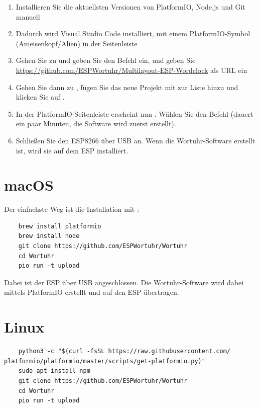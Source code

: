 \documentclass[12pt,a4paper, german,oneside, headinclude, headsepline,plainheadsepline,BCOR20mm, DIV18,parskip=half, openright, numbers=noenddot, captions=tableheading,version=first,listof=totoc,version=first]{scrbook}
\begin{document}
\begin{enumerate}
    \item Installieren Sie die aktuellsten Versionen von PlatformIO, Node.js und Git manuell
    \item Dadurch wird Visual Studio Code installiert, mit einem PlatformIO-Symbol (Ameisenkopf/Alien) in der Seitenleiste
    \item Gehen Sie zu  und geben Sie den Befehl  ein, und geben Sie \href{https://github.com/ESPWortuhr/Multilayout-ESP-Wordclock}{https://github.com/ESPWortuhr/Multilayout-ESP-Wordclock} als URL ein
    \item Gehen Sie dann zu , fügen Sie das neue Projekt mit  zur Liste hinzu und klicken Sie auf .
    \item In der PlatformIO-Seitenleiste erscheint nun . Wählen Sie den Befehl  (dauert ein paar Minuten, die Software wird zuerst erstellt).
    \item Schließen Sie den ESP8266 über USB an. Wenn die Wortuhr-Software erstellt ist, wird sie auf dem ESP installiert.
\end{enumerate}

\section{macOS}

Der einfachste Weg ist die Installation mit :

\begin{lstlisting}
    brew install platformio
    brew install node
    git clone https://github.com/ESPWortuhr/Wortuhr
    cd Wortuhr
    pio run -t upload
\end{lstlisting}

Dabei ist der ESP über USB angeschlossen. Die Wortuhr-Software wird dabei mittels PlatformIO erstellt und auf den ESP übertragen.

\section{Linux}

\begin{lstlisting}
    python3 -c "$(curl -fsSL https://raw.githubusercontent.com/ platformio/platformio/master/scripts/get-platformio.py)"
    sudo apt install npm
    git clone https://github.com/ESPWortuhr/Wortuhr
    cd Wortuhr
    pio run -t upload
\end{lstlisting}
\end{document}
